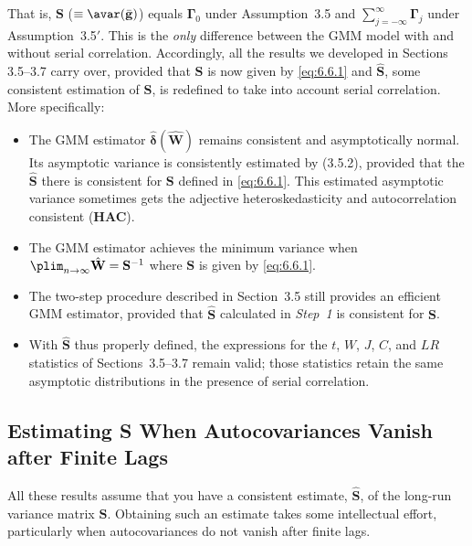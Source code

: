 That is, $\mathbf{S}$ ($\equiv \avar(\bar{\mathbf{g}})$) equals $\bm{\Gamma}_0$ under Assumption~3.5 and $\sum_{j=-\infty}^{\infty} \bm{\Gamma}_j$ under
Assumption~3.5$'$. This is the \emph{only} difference between the GMM model with and
without serial correlation. Accordingly, all the results we developed in Sections
3.5--3.7 carry over, provided that $\mathbf{S}$ is now given by \eqref{eq:6.6.1} and $\hat{\mathbf{S}}$, some consistent
estimation of $\mathbf{S}$, is redefined to take into account serial correlation. More
specifically:
\begin{itemize}
\item The GMM estimator $\hat{\bm{\delta}}(\hat{\mathbf{W}})$ remains consistent and asymptotically normal. Its
asymptotic variance is consistently estimated by (3.5.2), provided that the $\hat{\mathbf{S}}$
there is consistent for $\mathbf{S}$ defined in \eqref{eq:6.6.1}. This estimated asymptotic variance
sometimes gets the adjective heteroskedasticity and autocorrelation consistent
(\textbf{HAC}).

\item The GMM estimator achieves the minimum variance when $\plim_{n \to \infty} \hat{\mathbf{W}} = \mathbf{S}^{-1}$
where $\mathbf{S}$ is given by \eqref{eq:6.6.1}.

\item The two-step procedure described in Section~3.5 still provides an efficient GMM
estimator, provided that $\hat{\mathbf{S}}$ calculated in \emph{Step~1} is consistent for $\mathbf{S}$.

\item With $\hat{\mathbf{S}}$ thus properly defined, the expressions for the $t$, $W$, $J$, $C$, and $LR$ statistics
of Sections~3.5--3.7 remain valid; those statistics retain the same asymptotic
distributions in the presence of serial correlation.
\end{itemize}

\subsection*{Estimating S When Autocovariances Vanish after Finite Lags}

All these results assume that you have a consistent estimate, $\hat{\mathbf{S}}$, of the long-run
variance matrix $\mathbf{S}$. Obtaining such an estimate takes some intellectual effort, particularly
when autocovariances do not vanish after finite lags.

